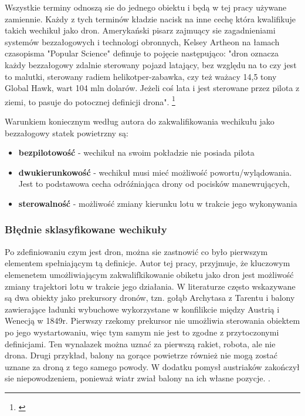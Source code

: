 Wszystkie terminy odnoszą sie do jednego obiektu i będą w tej pracy używane zamiennie. Każdy z tych terminów kładzie nacisk na inne cechę która kwalifikuje takich wechikuł jako dron. Amerykański pisarz zajmuący sie zagadnieniami systemów bezzałogowych i technologi obronnych,  Kelsey Artheon na łamach czasopisma "Popular Science" definuje to pojęcie następująco: "dron oznacza każdy bezzałogowy zdalnie sterowany pojazd latający, bez względu na to czy jest to malutki, sterowany radiem helikotper-zabawka, czy też ważacy 14,5 tony Global Hawk, wart 104 mln dolarów. Jeżeli coś lata i jest sterowane przez pilota z ziemi, to pasuje do potocznej definicji drona". \footnote{\cite{arton-kelsey}} \cite{dron-ibuk} 

\hspace{1cm}Warunkiem koniecznym według autora do zakwalifikowania wechikułu jako bezzałogowy statek powietrzny są:
\begin{itemize}
  \item \textbf{bezpilotowość} - wechikuł na swoim pokładzie nie posiada pilota
  \item \textbf{dwukierunkowość} - wechikuł musi mieć możliwość powortu/wylądowania. Jest to podstawowa cecha odróźniająca drony od pocisków manewrujących, 
  \item  \textbf{sterowalność} - możliwość zmiany kierunku lotu w trakcie jego wykonywania
\end{itemize}

\subsubsection{Błędnie sklasyfikowane wechikuły}

\hspace{1cm}Po zdefiniowaniu czym jest dron, można sie zastnowić co było pierwszym elementem spełniającym tą definicje. Autor tej pracy, przyjmuje, że kluczowym elemenetem umożliwiającym zakwalifkikowanie obiketu jako dron jest możliwość zmiany trajektori lotu w trakcie jego działania. W literaturze często wskazywane są dwa obiekty jako prekursory dronów, tzn. gołąb Archytasa z Tarentu i balony zawierające ładunki wybuchowe wykorzystane w konfilikcie między Austrią i Wenecją w 1849r. Pierwszy rzekomy prekursor nie umożliwia sterowania obiektem po jego wystartowaniu, więc tym samym nie jest to zgodne z przytoczonymi definicjami. Ten wynalazek można uznać za pierwszą rakiet, robota, ale nie drona. Drugi przykład, balony na gorące powietrze również nie mogą zostać uznane za droną z tego samego powody. W dodatku pomysł austriaków zakończył sie niepowodzeniem, ponieważ wiatr zwiał balony na ich własne pozycje. \cite{dron-ibuk}. 


